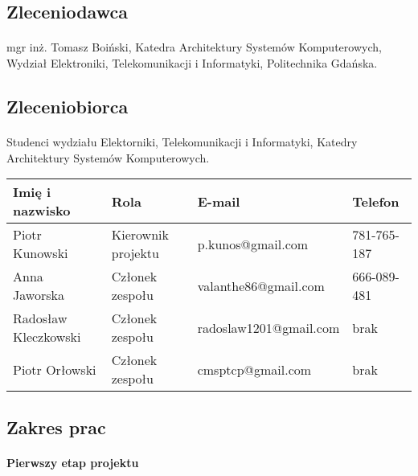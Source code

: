 \subsection{Zleceniodawca}
\paragraph{} mgr inż. Tomasz Boiński, Katedra Architektury Systemów Komputerowych, Wydział Elektroniki, Telekomunikacji i Informatyki, Politechnika Gdańska.


\subsection{Zleceniobiorca}
\paragraph{} Studenci wydziału Elektorniki, Telekomunikacji i Informatyki, Katedry Architektury Systemów Komputerowych.
\begin{center}
\begin{tabular}{|l|l|l|l|}
\hline
\textbf{Imię i nazwisko} & \textbf{Rola} & \textbf{E-mail} & \textbf{Telefon} \tabularnewline \hline
Piotr Kunowski & Kierownik projektu & p.kunos@gmail.com & 781-765-187 \tabularnewline \hline
Anna Jaworska & Członek zespołu & valanthe86@gmail.com & 666-089-481 \tabularnewline \hline
Radosław Kleczkowski & Członek zespołu & radoslaw1201@gmail.com & brak \tabularnewline \hline
Piotr Orłowski & Członek zespołu & cmsptcp@gmail.com & brak \tabularnewline \hline
\end{tabular}
\end{center}

\subsection{Zakres prac}

\paragraph{} \textbf{Pierwszy etap projektu}

